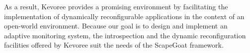 As a result, Kevoree provides a promising environment by facilitating the implementation of dynamically reconfigurable applications in the context of an open-world environment.
Because our goal is to design and implement an adaptive monitoring system, the introspection and the dynamic reconfiguration facilities offered by Kevoree suit the needs of the ScapeGoat framework.






